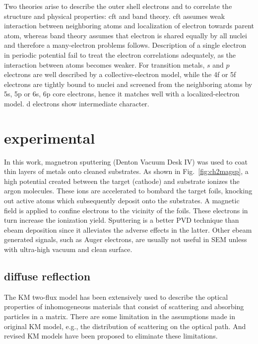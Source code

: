 Two theories arise to describe the outer shell electrons and to correlate the structure and physical properties: \gls{cft} and band theory.\cite{Goodenough1971} \gls{cft} assumes weak interaction between neighboring atoms and localization of electron towards parent atom, whereas band theory assumes that electron is shared equally by all nuclei and therefore a many-electron problems follows. Description of a single electron in periodic potential fail to treat the electron correlations adequately, as the interaction between atoms becomes weaker. For transition metals, $s$ and $p$ electrons are well described by a collective-electron model, while the 4f or 5f electrons are tightly bound to nuclei and screened from the neighboring atoms by 5s, 5p or 6s, 6p core electrons, hence it matches well with a localized-electron model. d electrons show intermediate character.


\chapter{experimental}
In this work, magnetron sputtering (Denton Vacuum Desk IV) was used to coat thin layers of metals onto cleaned substrates. As shown in Fig.~\ref{fig:ch2magsp}, a high potential created between the target (cathode) and substrate ionizes the argon molecules. These ions are accelerated to bombard the target foils, knocking out active atoms which subsequently deposit onto the substrates. A magnetic field is applied to confine electrons to the vicinity of the foils. These electrons in turn increase the ionization yield.
Sputtering is a better PVD technique than \gls{ebeam} deposition since it alleviates the adverse effects in the latter. 
Other \gls{ebeam} generated signals, such as Auger electrons, are usually not useful in SEM unless with ultra-high vacuum and clean surface.

\section{diffuse reflection}

The KM two-flux model has been extensively used to describe the optical properties of inhomogeneous materials that consist of scattering and absorbing particles in a matrix.\cite{Vargas1997} There are some limitation in the assumptions made in original KM model, e.g., the distribution of scattering on the optical path. And revised KM models have been proposed to eliminate these limitations.\cite{Yang2004}  


